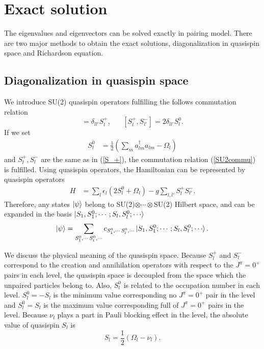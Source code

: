 \documentclass[11pt]{book} %
\begin{document}
\section{Exact solution}
The eigenvalues and eigenvectors can be solved exactly in pairing model. There are two major methods to obtain the exact solutions, diagonalization in quasispin space and Richardson equation.

\subsection{Diagonalization in quasispin space}
We introduce SU(2) quasispin operators fulfilling the follows commutation relation
\begin{equation}
  [S_l^0,S_{l'}^{+}] = \delta_{ll'}S_{l}^{+},\hspace{20pt}[S_{l}^{+},S_{l'}^{-}] = 2\delta_{ll'}S_{l}^{0}. 
  \label{SU2commu}
\end{equation}
If we set 
\begin{align}
  S_l^0 &= \frac{1}{2}(\sum_ma_{lm}^{\dag}a_{lm}-\Omega_l)
  \label{S_0}
\end{align}
and $S_l^+, S_l^-$ are the same as in (\ref{S_+}), the commutation relation (\ref{SU2commu}) is fulfilled. Using quasispin operators, the Hamiltonian can be represented by quasispin operators
\begin{align}
	H &= \sum_l \epsilon_l (2S_l^0+\Omega_l) - g \sum_{l,l'} S_l^+ S_{l'}^- .
\end{align}
Therefore, any states $\ket{\psi}$ belong to SU(2)$\otimes\cdots\otimes$SU(2) Hilbert space, and can be expanded in the basis $\ket{S_1,S_1^0;\cdots;S_l,S_l^0;\cdots}$
\begin{equation}
  \ket{\psi} = \sum_{S_1^0,\cdots\,S_l^0,\cdots}c_{S_1^0,\cdots\,S_l^0,\cdots}\ket{S_1,S_1^0;\cdots;S_l,S_l^0;\cdots} .
\end{equation}

We discuss the physical meaning of the quasispin space. Because $S_l^+$ and $S_l^-$ correspond to the creation and annihilation operators with respect to the $J^{\pi}=0^+$ pairs in each level, the quasispin space is decoupled from the space which the unpaired particles belong to. 
Also, $S_l^0$ is related to the occupation number in each level. $S_l^0=-S_l$ is the minimum value corresponding no $J^{\pi}=0^+$ pair in the level and $S_l^0=S_l$ is the maximum value corresponding full of $J^{\pi}=0^+$ pairs in the level. Because $\nu_l$ plays a part in Pauli blocking effect in the level, the absolute value of quasispin $S_l$ is
\begin{equation}
  S_l = \frac{1}{2}(\Omega_l-\nu_l).
\end{equation}
\end{document}
